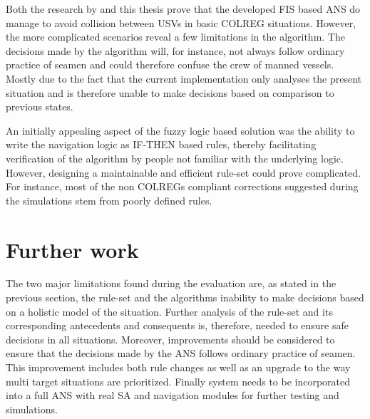 Both the research by \textcite{perera2012intelligent,perera2010smooth_param}  and this thesis prove that the developed FIS based ANS do manage to avoid collision between USVs in basic COLREG situations. However, the more complicated scenarios  reveal a few limitations in the algorithm. The decisions made by the algorithm will, for instance, not always follow ordinary practice of seamen and could therefore confuse the crew of manned vessels. Mostly due to the fact that the current implementation  only analyses the present situation and is therefore unable to make decisions based on comparison to previous states.

An initially appealing aspect of the fuzzy logic based solution was the ability to write the navigation logic as IF-THEN based rules, thereby facilitating verification of the algorithm by people not familiar with the underlying logic. However, designing a maintainable and efficient  rule-set could prove complicated. For instance, most of the non COLREGs compliant corrections suggested during the simulations stem from poorly defined rules.






\section{Further work}%
The two major limitations found during the evaluation are, as stated in the previous section, the rule-set and the algorithms inability to make decisions based on a holistic model of the situation.
Further analysis of the rule-set and its corresponding antecedents and consequents is, therefore, needed to ensure safe decisions in all situations. Moreover, improvements should be considered to ensure that the decisions made by the ANS follows ordinary practice of seamen. This improvement includes both rule changes as well as an upgrade to the way multi target situations are prioritized.
Finally system needs to be incorporated into a full ANS with real SA and navigation modules for further testing and simulations.
